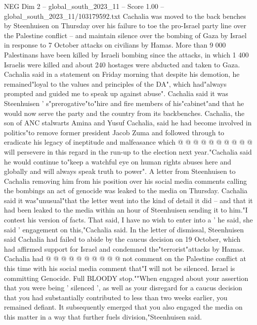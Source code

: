 \begin{textsample}{NEG Dim 2 – global\_south\_2023\_11 – Score 1.00 – global\_south\_2023\_11/103179592.txt}  \label{ex:f2_neg_232}
Cachalia was moved to the back benches by Steenhuisen on Thursday over his failure to toe the pro-Israel party line over the Palestine conflict -- and maintain silence over the bombing of Gaza by Israel in response to 7 October attacks on civilians by Hamas.
More than 9 000 Palestinans have been killed by Israeli bombing since the attacks, in which 1 400 Israelis were killed and about 240 hostages were abducted and taken to Gaza.
Cachalia said in a statement on Friday morning that despite his demotion, he remained"loyal to the values and principles of the DA", which had"always prompted and guided me to speak up against abuse".
Cachalia said it was Steenhuisen ' s"prerogative"to"hire and fire members of his"cabinet"and that he would now serve the party and the country from its backbenches.
Cachalia, the son of ANC stalwarts Amina and Yusuf Cachalia, said he had become involved in politics"to remove former president Jacob Zuma and followed through to eradicate his legacy of ineptitude and malfeasance which @ @ @ @ @ @ @ @ @ @ will persevere in this regard in the run-up to the election next year."Cachalia said he would continue to"keep a watchful eye on human rights abuses here and globally and will always speak truth to power".
A letter from Steenhuisen to Cachalia removing him from his position over his social media comments calling the bombings an act of genocide was leaked to the media on Thursday.
Cachalia said it was"unusual"that the letter went into the kind of detail it did -- and that it had been leaked to the media within an hour of Steenhuisen sending it to him."I contest his version of facts.
That said, I have no wish to enter into a ' he said, she said ' engagement on this,"Cachalia said.
In the letter of dismissal, Steenhuisen said Cachalia had failed to abide by the caucus decision on 19 October, which had affirmed support for Israel and condemned the"terrorist"attacks by Hamas.
Cachalia had @ @ @ @ @ @ @ @ @ @ not comment on the Palestine conflict at this time with his social media comment that"I will not be silenced.
Israel is committing Genocide.
Full BLOODY stop.""When engaged about your assertion that you were being ' silenced ', as well as your disregard for a caucus decision that you had substantially contributed to less than two weeks earlier, you remained defiant.
It subsequently emerged that you also engaged the media on this matter in a way that further fuels division,"Steenhuisen said.

\end{textsample}
